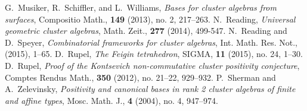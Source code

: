 \documentclass[10pt]{amsart}
\theoremstyle{remark}
\numberwithin{equation}{section}
\begin{document}
\begin{thebibliography}{99}
   G.~Musiker, R.~Schiffler, and L.~Williams, \emph{Bases for cluster algebras from surfaces}, Compositio Math., {\bf 149} (2013), no. 2, 217--263.
   N.~Reading, \emph{Universal geometric cluster algebras}, Math. Zeit., {\bf 277 } (2014), 499-547.
   N.~Reading and D.~Speyer, \emph{Combinatorial frameworks for cluster algebras}, Int. Math. Res. Not., (2015), 1--65.
   D.~Rupel, \emph{The Feigin tetrahedron}, SIGMA, {\bf 11} (2015), no. 24, 1--30.
   D.~Rupel, \emph{Proof of the Kontsevich non-commutative cluster positivity conjecture}, Comptes Rendus Math., {\bf 350} (2012), no. 21--22, 929--932.
   P.~Sherman and A.~Zelevinsky, \emph{Positivity and canonical bases in rank 2 cluster algebras of finite and affine types}, Mosc. Math. J., \textbf{4} (2004), no. 4, 947--974.

\end{thebibliography}
\end{document}
